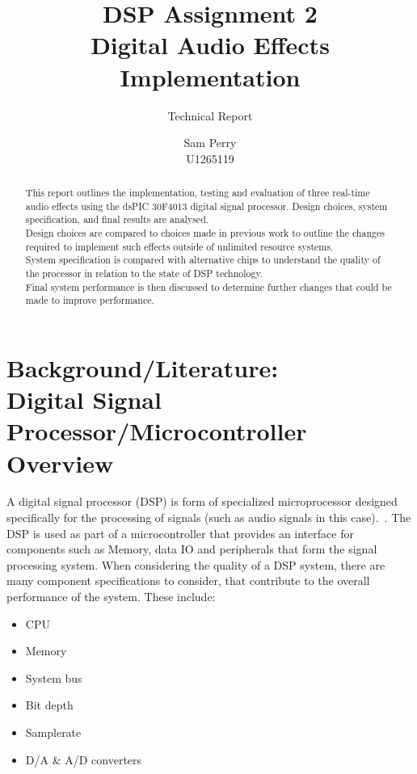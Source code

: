 \documentclass{scrartcl}
\begin{document}
    \title{DSP Assignment 2\\Digital Audio Effects Implementation}
    \subtitle{\LARGE{Technical Report}}
    \author{Sam Perry\\U1265119}
    \date{}
    \maketitle

    \begin{abstract}
        This report outlines the implementation, testing and evaluation of
        three real-time audio effects using the dsPIC 30F4013 digital signal
        processor.  Design choices, system specification, and final results
        are analysed.\\
        Design choices are compared to choices made in previous work to outline
        the changes required to implement such effects outside of
        unlimited resource systems.\\
        System specification is compared with alternative chips to understand
        the quality of the processor in relation to the state of DSP
        technology.\\
        Final system performance is then discussed to determine further
        changes that could be made to improve performance.
    \end{abstract}

    \section{Background/Literature:\\Digital Signal Processor/Microcontroller
    Overview}
    A digital signal processor (DSP) is form of specialized microprocessor
    designed specifically for the processing of signals (such as audio signals
    in this case).~\parencite[p.11-12]{libtak2006ieh}. The DSP is used as part
    of a microcontroller that provides an interface for components such as
    Memory, data IO and peripherals that form the signal processing system.
    When considering the quality of a DSP system, there are many component
    specifications to consider, that contribute to the overall performance of
    the system. These include:
    \begin{itemize}
        \item CPU
        \item Memory
        \item System bus
        \item Bit depth
        \item Samplerate
        \item D/A \& A/D converters
    \end{itemize}
\end{document}
